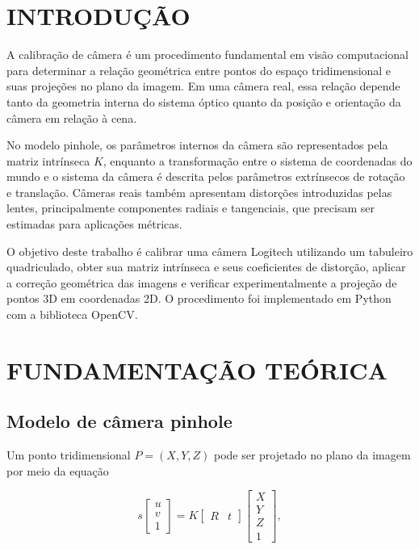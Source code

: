 \documentclass[12pt, a4paper, twoside, chapter=TITLE, subsection=TITLE, section=TITLE, subsubsection=TITLE, subsubsubsection=TITLE, english, german, brazil]{abntex2}
\begin{document}
\textual

\chapter{INTRODUÇÃO}
A calibração de câmera é um procedimento fundamental em visão computacional para determinar a relação geométrica entre pontos do espaço tridimensional e suas projeções no plano da imagem. Em uma câmera real, essa relação depende tanto da geometria interna do sistema óptico quanto da posição e orientação da câmera em relação à cena.

No modelo pinhole, os parâmetros internos da câmera são representados pela matriz intrínseca $K$, enquanto a transformação entre o sistema de coordenadas do mundo e o sistema da câmera é descrita pelos parâmetros extrínsecos de rotação e translação. Câmeras reais também apresentam distorções introduzidas pelas lentes, principalmente componentes radiais e tangenciais, que precisam ser estimadas para aplicações métricas.

O objetivo deste trabalho é calibrar uma câmera Logitech utilizando um tabuleiro quadriculado, obter sua matriz intrínseca e seus coeficientes de distorção, aplicar a correção geométrica das imagens e verificar experimentalmente a projeção de pontos 3D em coordenadas 2D. O procedimento foi implementado em Python com a biblioteca OpenCV.

\chapter{FUNDAMENTAÇÃO TEÓRICA}
\section{Modelo de câmera pinhole}
Um ponto tridimensional $P=(X,Y,Z)$ pode ser projetado no plano da imagem por meio da equação

\begin{equation}
 s
 \begin{bmatrix}
 u \\ v \\ 1
 \end{bmatrix}
 =
 K
 \begin{bmatrix}
 R & t
 \end{bmatrix}
 \begin{bmatrix}
 X \\ Y \\ Z \\ 1
 \end{bmatrix},
 \label{eq:projecao}
\end{equation}
\end{document}
